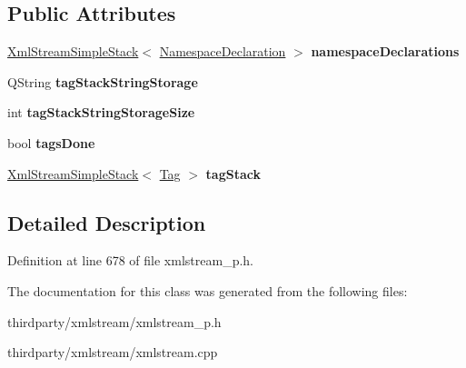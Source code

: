 \subsection*{Public Attributes}
\begin{DoxyCompactItemize}
\item 
\mbox{\label{class_xml_stream_private_tag_stack_a9363f42d301f97c66b5c912edc9cf1fa}} 
\hyperlink{class_xml_stream_simple_stack}{Xml\+Stream\+Simple\+Stack}$<$ \hyperlink{struct_xml_stream_private_tag_stack_1_1_namespace_declaration}{Namespace\+Declaration} $>$ {\bfseries namespace\+Declarations}
\item 
\mbox{\label{class_xml_stream_private_tag_stack_afed5515c4b9eb1de6a9608a1a5690a8d}} 
Q\+String {\bfseries tag\+Stack\+String\+Storage}
\item 
\mbox{\label{class_xml_stream_private_tag_stack_ae068239f23a89938296e330582a8784b}} 
int {\bfseries tag\+Stack\+String\+Storage\+Size}
\item 
\mbox{\label{class_xml_stream_private_tag_stack_a0723aed52811ba4e6577679605115d0b}} 
bool {\bfseries tags\+Done}
\item 
\mbox{\label{class_xml_stream_private_tag_stack_a7018f68322e6f7bfe56651cf517ae048}} 
\hyperlink{class_xml_stream_simple_stack}{Xml\+Stream\+Simple\+Stack}$<$ \hyperlink{struct_xml_stream_private_tag_stack_1_1_tag}{Tag} $>$ {\bfseries tag\+Stack}
\end{DoxyCompactItemize}


\subsection{Detailed Description}


Definition at line 678 of file xmlstream\+\_\+p.\+h.



The documentation for this class was generated from the following files\+:\begin{DoxyCompactItemize}
\item 
thirdparty/xmlstream/xmlstream\+\_\+p.\+h\item 
thirdparty/xmlstream/xmlstream.\+cpp\end{DoxyCompactItemize}
